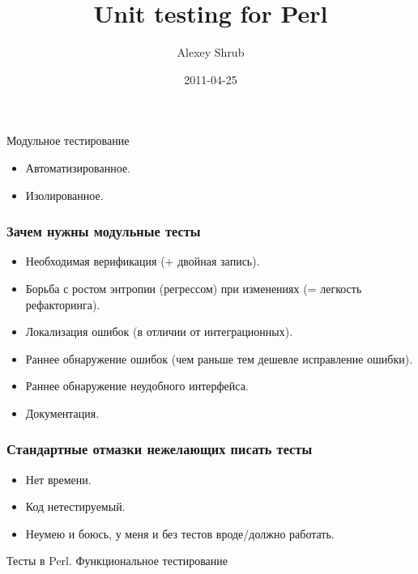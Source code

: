 \documentclass{beamer}
\title{Unit testing for Perl}
\author{Alexey Shrub}
\institute{ashrub@yandex.ru}
\date{2011-04-25}
\begin{document}
\maketitle

\begin{frame}{Модульное тестирование}
\begin{itemize}
\item Автоматизированное.
\item Изолированное.
\end{itemize}
\end{frame}

\begin{frame}
\frametitle{Зачем нужны модульные тесты}
\begin{itemize}
\item Необходимая верификация (+ двойная запись).
\pause
\item Борьба с ростом энтропии (регрессом) при изменениях (= легкость рефакторинга).
\pause
\item Локализация ошибок (в отличии от интеграционных).
\pause
\item Раннее обнаружение ошибок (чем раньше тем дешевле исправление ошибки).
\pause
\item Раннее обнаружение неудобного интерфейса.
\pause
\item Документация.
\end{itemize}
\end{frame}

\begin{frame}
\frametitle{Стандартные отмазки нежелающих писать тесты}
\begin{itemize}
\item Нет времени.
\item Код нетестируемый.
\item Неумею и боюсь, у меня и без тестов вроде/должно работать.
\end{itemize}
\end{frame}

\begin{frame}
\begin{center}
Тесты в Perl. Функциональное тестирование
\end{center}
\end{frame}
\end{document}
